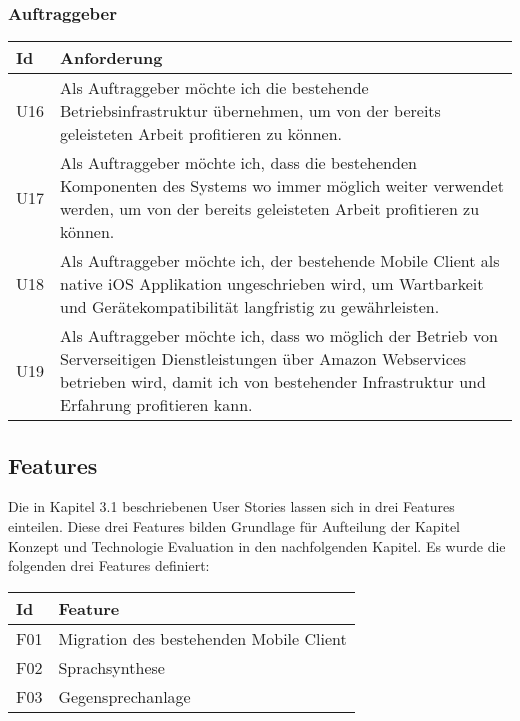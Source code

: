 \subsubsection{Auftraggeber}

\begin{table}[h]
    \centering
    \begin{tabular}{|l|p{15cm}|}
        \hline
        \textbf{Id} & \textbf{Anforderung}                                                                                                                                                                          \\
        \hline
        U16         & Als Auftraggeber möchte ich die bestehende Betriebsinfrastruktur übernehmen, um von der bereits geleisteten Arbeit profitieren zu können.                                                     \\
        \hline
        U17         & Als Auftraggeber möchte ich, dass die bestehenden Komponenten des Systems wo immer möglich weiter verwendet werden, um von der bereits geleisteten Arbeit profitieren zu können.               \\
        \hline
        U18         & Als Auftraggeber möchte ich, der bestehende Mobile Client als native iOS Applikation ungeschrieben wird, um Wartbarkeit und Gerätekompatibilität langfristig zu gewährleisten.                            \\
        \hline
        U19         & Als Auftraggeber möchte ich, dass wo möglich der Betrieb von Serverseitigen Dienstleistungen über Amazon Webservices betrieben wird, damit ich von bestehender Infrastruktur und Erfahrung profitieren kann. \\
        \hline
    \end{tabular}\label{tab:userstories3}
\end{table}

\subsection{Features}

Die in Kapitel 3.1 beschriebenen User Stories lassen sich in drei Features einteilen.
Diese drei Features bilden Grundlage für Aufteilung der Kapitel Konzept und Technologie Evaluation in den nachfolgenden Kapitel.
Es wurde die folgenden drei Features definiert:

\begin{table}[h]
    \centering
    \begin{tabular}{|l|p{15cm}|}
        \hline
        \textbf{Id} & \textbf{Feature}                        \\
        \hline
        F01         & Migration des bestehenden Mobile Client \\
        \hline
        F02         & Sprachsynthese                          \\
        \hline
        F03         & Gegensprechanlage                       \\
        \hline
    \end{tabular}\label{tab:features}
\end{table}

